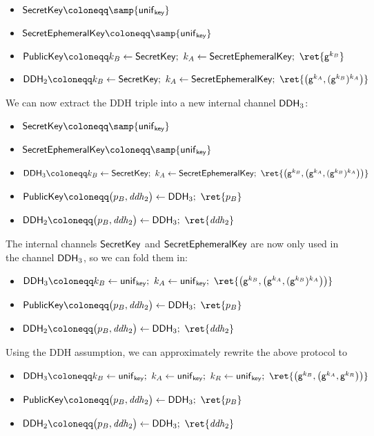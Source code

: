 \begin{itemize}
\item $\SecretKey \coloneqq \samp{\unif_\key}$
\item $\SecretEphemeralKey \coloneqq \samp{\unif_\key}$
\item {\color{red} $\PublicKey \coloneqq k_B \leftarrow \SecretKey; \ k_A \leftarrow \SecretEphemeralKey; \ \ret{\gen^{k_B}}$}
\item $\DDH_2 \coloneqq k_B \leftarrow \SecretKey; \ k_A \leftarrow \SecretEphemeralKey; \ \ret{\big(\gen^{k_A}, (\gen^{k_B})^{k_A}\big)}$
\end{itemize}

\noindent We can now extract the DDH triple into a new internal channel $\mathsf{DDH}_3$:

\begin{itemize}
\item $\SecretKey \coloneqq \samp{\unif_\key}$
\item $\SecretEphemeralKey \coloneqq \samp{\unif_\key}$
\item {\color{red} $\DDH_3 \coloneqq k_B \leftarrow \SecretKey; \ k_A \leftarrow \SecretEphemeralKey; \ \ret{\big(\gen^{k_B}, \big(\gen^{k_A}, (\gen^{k_B})^{k_A}\big)\big)}$}
\item {\color{red} $\PublicKey \coloneqq \big(p_B, \mathit{ddh}_2\big) \leftarrow \DDH_3; \ \ret{p_B}$}
\item {\color{red} $\DDH_2 \coloneqq \big(p_B, \mathit{ddh}_2\big) \leftarrow \DDH_3; \ \ret{\mathit{ddh}_2}$}
\end{itemize}

\noindent The internal channels $\mathsf{SecretKey}$ and $\mathsf{SecretEphemeralKey}$ are now only used in the channel $\mathsf{DDH}_3$, so we can fold them in:

\begin{itemize}
\item {\color{red} $\DDH_3 \coloneqq k_B \leftarrow \unif_\key; \ k_A \leftarrow \unif_\key; \ \ret{\big(\gen^{k_B}, \big(\gen^{k_A}, (\gen^{k_B})^{k_A}\big)\big)}$}
\item $\PublicKey \coloneqq \big(p_B, \mathit{ddh}_2\big) \leftarrow \DDH_3; \ \ret{p_B}$
\item $\DDH_2 \coloneqq \big(p_B, \mathit{ddh}_2\big) \leftarrow \DDH_3; \ \ret{\mathit{ddh}_2}$
\end{itemize}

\noindent Using the DDH assumption, we can approximately rewrite the above protocol to

\begin{itemize}
\item {\color{red} $\DDH_3 \coloneqq k_B \leftarrow \unif_\key; \ k_A \leftarrow \unif_\key; \ k_R \leftarrow \unif_\key; \ \ret{\big(\gen^{k_B}, \big(\gen^{k_A}, \gen^{k_R}\big)\big)}$}
\item $\PublicKey \coloneqq \big(p_B, \mathit{ddh}_2\big) \leftarrow \DDH_3; \ \ret{p_B}$
\item $\DDH_2 \coloneqq \big(p_B, \mathit{ddh}_2\big) \leftarrow \DDH_3; \ \ret{\mathit{ddh}_2}$
\end{itemize}

